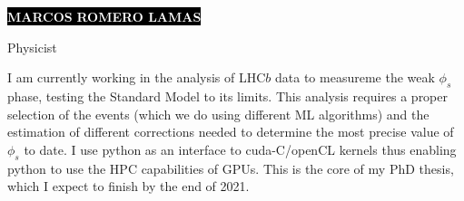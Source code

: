 \documentclass[9pt]{resumetemplate}
\begin{document}
\begin{minipage}[t]{0.45\textwidth}
	\vspace{-\baselineskip}
	
	\colorbox{black}{{\HUGE\textcolor{white}{\textbf{\MakeUppercase{%
	  Marcos%
	}}}}}
	\colorbox{black}{{\HUGE\textcolor{white}{\textbf{\MakeUppercase{%
	  Romero Lamas%
	}}}}}
	
	\vspace{6pt}
	
	{\huge Physicist} %
\end{minipage}
\vspace{0.5cm}


\begin{minipage}[t]{0.55\textwidth}
	\vspace{-\baselineskip}
	
	I am currently working in the analysis of LHC$b$ data to measureme the weak 
	$\phi_s$ phase, testing the Standard Model to its limits. This analysis 
	requires a proper selection of the events (which we do using different ML 
	algorithms) and the estimation of different corrections needed to determine
	the most precise value of $\phi_s$ to date. I use python as an interface to
	cuda-C/openCL kernels thus enabling python to use the HPC capabilities of
	GPUs. This is the core of my PhD thesis, which I expect to finish by the end
	of 2021.

\end{minipage}
\hfill
%
\end{document}
